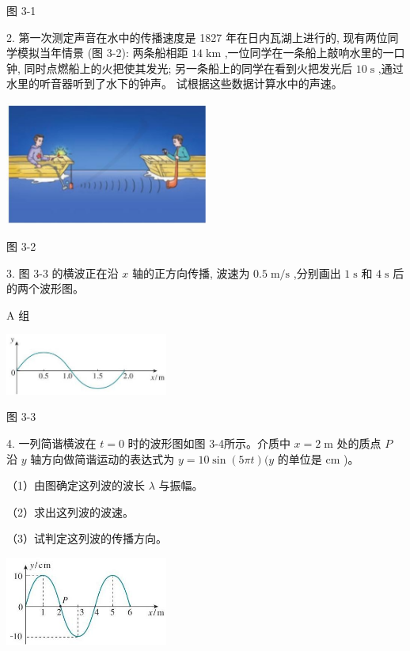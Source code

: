 \documentclass[10pt]{article}
\begin{document}
图 3-1

2. 第一次测定声音在水中的传播速度是 1827 年在日内瓦湖上进行的, 现有两位同学模拟当年情景 (图 3-2): 两条船相距 \({14}\mathrm{\;{km}}\) ,一位同学在一条船上敲响水里的一口钟, 同时点燃船上的火把使其发光; 另一条船上的同学在看到火把发光后 \({10}\mathrm{\;s}\) ,通过水里的听音器听到了水下的钟声。 试根据这些数据计算水中的声速。

\begin{center}
\includegraphics[max width=0.5\textwidth]{images/01910e4c-ebb8-7d2c-8f2f-2375bc1d2d12_87_628933.jpg}
\end{center}

图 3-2

3. 图 3-3 的横波正在沿 \(x\) 轴的正方向传播, 波速为 \({0.5}\mathrm{\;m}/\mathrm{s}\) ,分别画出 \(1\mathrm{\;s}\) 和 \(4\mathrm{\;s}\) 后的两个波形图。

A 组

\begin{center}
\includegraphics[max width=0.4\textwidth]{images/01910e4c-ebb8-7d2c-8f2f-2375bc1d2d12_87_514392.jpg}
\end{center}

图 3-3

4. 一列简谐横波在 \(t = 0\) 时的波形图如图 3-4所示。介质中 \(x = 2\mathrm{\;m}\) 处的质点 \(P\) 沿 \(y\) 轴方向做简谐运动的表达式为 \(y = {10}\sin \left( {5\pi t}\right) (y\) 的单位是 \(\mathrm{{cm}}\) )。

（1）由图确定这列波的波长 \(\lambda\) 与振幅。

（2）求出这列波的波速。

（3）试判定这列波的传播方向。

\begin{center}
\includegraphics[max width=0.4\textwidth]{images/01910e4c-ebb8-7d2c-8f2f-2375bc1d2d12_87_214445.jpg}
\end{center}
\end{document}
